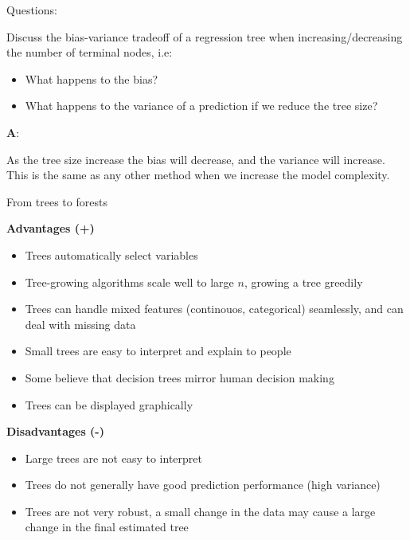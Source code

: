 \documentclass[10pt,ignorenonframetext,]{beamer}
\providecommand{\tightlist}{%
  \setlength{\itemsep}{0pt}\setlength{\parskip}{0pt}}
\begin{document}
\begin{frame}

\begin{block}{Questions:}

Discuss the bias-variance tradeoff of a regression tree when
increasing/decreasing the number of terminal nodes, i.e:

\begin{itemize}
\tightlist
\item
  What happens to the bias?
\item
  What happens to the variance of a prediction if we reduce the tree
  size?
\end{itemize}

\end{block}

\end{frame}

\begin{frame}

\textbf{A}:

As the tree size increase the bias will decrease, and the variance will
increase. This is the same as any other method when we increase the
model complexity.

\end{frame}

\begin{frame}{From trees to forests}

\textbf{Advantages (+)}

\begin{itemize}
\tightlist
\item
  Trees automatically select variables
\item
  Tree-growing algorithms scale well to large \(n\), growing a tree
  greedily
\item
  Trees can handle mixed features (continouos, categorical) seamlessly,
  and can deal with missing data
\item
  Small trees are easy to interpret and explain to people
\item
  Some believe that decision trees mirror human decision making
\item
  Trees can be displayed graphically
\end{itemize}

\textbf{Disadvantages (-)}

\begin{itemize}
\tightlist
\item
  Large trees are not easy to interpret
\item
  Trees do not generally have good prediction performance (high
  variance)
\item
  Trees are not very robust, a small change in the data may cause a
  large change in the final estimated tree
\end{itemize}

\end{frame}
\end{document}
